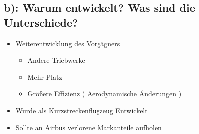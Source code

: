 \documentclass[11pt,a4paper]{article}
\begin{document}
\subsection*{b): Warum entwickelt? Was sind die Unterschiede?}
\begin{itemize}
\item Weiterentwicklung des Vorgägners
\begin{itemize}
\item Andere Triebwerke
\item Mehr Platz
\item Größere Effizienz ( Aerodynamische Änderungen )
\end{itemize}
\item Wurde als Kurzstreckenflugzeug Entwickelt
\item Sollte an Airbus verlorene Markanteile aufholen
\end{itemize}
\end{document}
